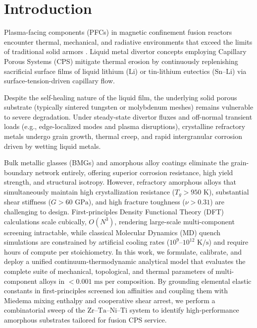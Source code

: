 \documentclass[aps,prmaterials,reprint,superscriptaddress,amsmath,amssymb,floatfix]{revtex4-2}
\begin{document}
\maketitle

\section{Introduction}
Plasma-facing components (PFCs) in magnetic confinement fusion reactors encounter thermal, mechanical, and radiative environments that exceed the limits of traditional solid armors \cite{CPS_Review_2020}. Liquid metal divertor concepts employing Capillary Porous Systems (CPS) mitigate thermal erosion by continuously replenishing sacrificial surface films of liquid lithium ($\text{Li}$) or tin-lithium eutectics ($\text{Sn--Li}$) via surface-tension-driven capillary flow.

Despite the self-healing nature of the liquid film, the underlying solid porous substrate (typically sintered tungsten or molybdenum meshes) remains vulnerable to severe degradation. Under steady-state divertor fluxes and off-normal transient loads (e.g., edge-localized modes and plasma disruptions), crystalline refractory metals undergo grain growth, thermal creep, and rapid intergranular corrosion driven by wetting liquid metals.

Bulk metallic glasses (BMGs) and amorphous alloy coatings eliminate the grain-boundary network entirely, offering superior corrosion resistance, high yield strength, and structural isotropy. However, refractory amorphous alloys that simultaneously maintain high crystallization resistance ($T_g > 950\text{ K}$), substantial shear stiffness ($G > 60\text{ GPa}$), and high fracture toughness ($\nu > 0.31$) are challenging to design. First-principles Density Functional Theory (DFT) calculations scale cubically, $O(N^3)$, rendering large-scale multi-component screening intractable, while classical Molecular Dynamics (MD) quench simulations are constrained by artificial cooling rates ($10^9$--$10^{12}\text{ K/s}$) and require hours of compute per stoichiometry.
In this work, we formulate, calibrate, and deploy a unified continuum-thermodynamic analytical model that evaluates the complete suite of mechanical, topological, and thermal parameters of multi-component alloys in $<0.001\text{ ms}$ per composition. By grounding elemental elastic constants in first-principles screened ion affinities and coupling them with Miedema mixing enthalpy and cooperative shear arrest, we perform a combinatorial sweep of the $\text{Zr--Ta--Ni--Ti}$ system to identify high-performance amorphous substrates tailored for fusion CPS service.
\end{document}
